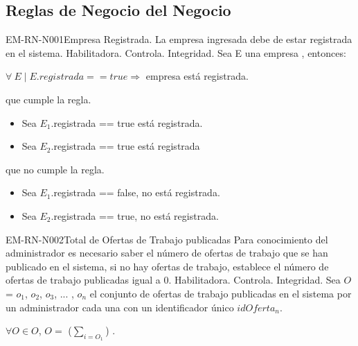 \subsection{Reglas de Negocio del Negocio}

\begin{BussinesRule}{EM-RN-N001}{Empresa Registrada.} 
	\BRitem[Descripción:] La empresa ingresada debe de estar registrada en el sistema. 
	\BRitem[Tipo:] Habilitadora.
	\BRitem[Nivel:] Controla.
	\BRitem[Clase:] Integridad.
	\BRitem[Sentencia: ] Sea E una empresa , entonces:
	\begin{center}
		$\forall \: E  \mid E.registrada == true \Rightarrow$ empresa está registrada.
	\end{center}
	 que cumple la regla.
		\begin{itemize}
			\item Sea $E_{1}$.registrada == true está registrada.
			\item Sea $E_{2}$.registrada == true está registrada
		\end{itemize}
	 que no cumple la regla.
		\begin{itemize}
			\item Sea $E_{1}$.registrada == false, no está registrada. 
			\item Sea $E_{2}$.registrada == true, no está registrada.
		\end{itemize}
\end{BussinesRule}

\begin{BussinesRule}{EM-RN-N002}{Total de Ofertas de Trabajo publicadas} 
	\BRitem[Descripción:] Para conocimiento del administrador es necesario saber el número de ofertas de trabajo que se han publicado en el sistema, si no hay ofertas de trabajo, establece el número de ofertas de trabajo publicadas igual a 0. 
	\BRitem[Tipo:] Habilitadora.
	\BRitem[Nivel:] Controla.
	\BRitem[Clase:] Integridad.
	\BRitem[Sentencia: ] Sea $O$ = {$o_{1}$, $o_{2}$, $o_{3}$, ... , $o_{n}$} el conjunto de ofertas de trabajo publicadas en el sistema por un administrador cada una con un identificador único $idOferta_{n}$.
	\begin{center}
		$\forall O \in O$, $O=$ ($ \sum_{i=O_1} $) .
	\end{center}
\end{BussinesRule}
	

